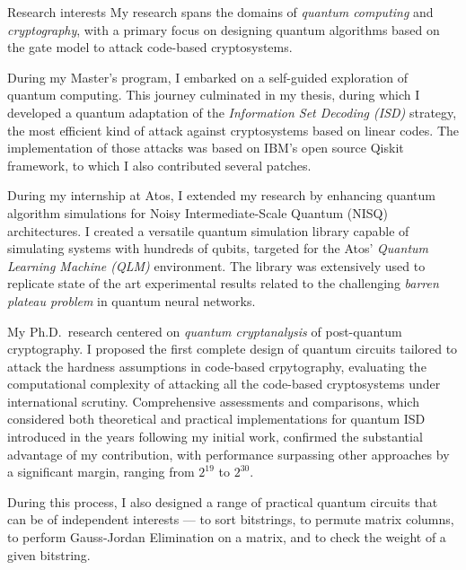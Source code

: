 \documentclass[
	a4paper, %
	11pt, %
]{tresume} %
\begin{document}
\begin{tSection}{Research interests}
  My research spans the domains of \emph{quantum computing} and
  \emph{cryptography}, with a primary focus on designing quantum algorithms
  based on the gate model to attack code-based cryptosystems.

  During my Master's program, I embarked on a self-guided exploration of quantum
  computing. This journey culminated in my thesis, during which I developed a
  quantum adaptation of the \emph{Information Set Decoding (ISD)} strategy, the
  most efficient kind of attack against cryptosystems based on linear codes. The
  implementation of those attacks was based on IBM's open source Qiskit
  framework, to which I also contributed several patches.

  During my internship at Atos, I extended my research by enhancing quantum
  algorithm simulations for Noisy Intermediate-Scale Quantum (NISQ)
  architectures. I created a versatile quantum simulation library capable of
  simulating systems with hundreds of qubits, targeted for the Atos'
  \emph{Quantum Learning Machine (QLM)} environment. The library was extensively
  used to replicate state of the art experimental results related to the
  challenging \emph{barren plateau problem} in quantum neural networks.

  My Ph.D.\ research centered on \emph{quantum cryptanalysis} of post-quantum
  cryptography. I proposed the first complete design of quantum circuits
  tailored to attack the hardness assumptions in code-based crpytography,
  evaluating the computational complexity of attacking all the code-based
  cryptosystems under international scrutiny.
  Comprehensive assessments and comparisons, which considered both theoretical
  and practical implementations for quantum ISD introduced in the years
  following my initial work, confirmed the substantial advantage of my
  contribution, with performance surpassing other approaches by a significant
  margin, ranging from $2^{19}$ to $2^{30}$.

  During this process, I also designed a range of practical quantum circuits
  that can be of independent interests --- to sort bitstrings, to permute matrix
  columns, to perform Gauss-Jordan Elimination on a matrix, and to check the
  weight of a given bitstring.

\end{tSection}
\clearpage
\end{document}
